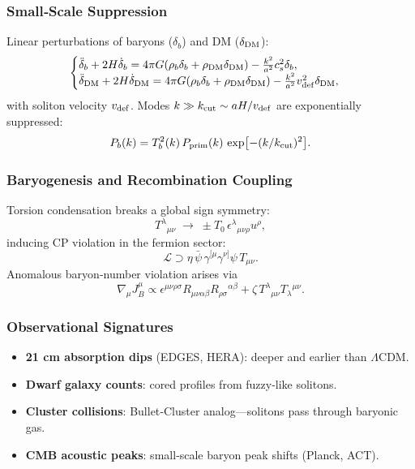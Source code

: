 \documentclass{article}
\begin{document}
\subsubsection{ Small‐Scale Suppression}
Linear perturbations of baryons (\(\delta_b\)) and DM (\(\delta_{\rm DM}\)):
\[
\begin{cases}
  \ddot\delta_b+2H\dot\delta_b
    =4\pi G(\rho_b\delta_b+\rho_{\rm DM}\delta_{\rm DM})
     -\tfrac{k^2}{a^2}c_s^2\delta_b,\\
  \ddot\delta_{\rm DM}+2H\dot\delta_{\rm DM}
    =4\pi G(\rho_b\delta_b+\rho_{\rm DM}\delta_{\rm DM})
     -\tfrac{k^2}{a^2}v_{\rm def}^2\delta_{\rm DM},
\end{cases}
\]
with soliton velocity \(v_{\rm def}\).  Modes \(k\gg k_{\rm cut}\sim aH/v_{\rm def}\)
are exponentially suppressed:
\[
  P_b(k)=T_b^2(k)\,P_{\rm prim}(k)\,\exp\bigl[-(k/k_{\rm cut})^2\bigr].
\]

\subsubsection{ Baryogenesis and Recombination Coupling}
Torsion condensation breaks a global sign symmetry:
\[
  T^{\lambda}{}_{\mu\nu}
  \;\to\;
  \pm T_0\,\epsilon^{\lambda}{}_{\mu\nu\rho}u^\rho,
\]
inducing CP violation in the fermion sector:
\[
  \mathcal L \supset \eta\,\bar\psi\,\gamma^{[\mu}\gamma^{\nu]}\psi\,T_{\mu\nu}.
\]
Anomalous baryon‐number violation arises via
\[
  \nabla_\mu J_B^\mu
  \propto \epsilon^{\mu\nu\rho\sigma}
    R_{\mu\nu\alpha\beta}R_{\rho\sigma}{}^{\alpha\beta}
  +\zeta\,T^{\lambda}{}_{\mu\nu}T_{\lambda}{}^{\mu\nu}.
\]

\subsubsection{ Observational Signatures}
\begin{itemize}
  \item \textbf{21 cm absorption dips} (EDGES, HERA): deeper and earlier than $\Lambda$CDM.  
  \item \textbf{Dwarf galaxy counts}: cored profiles from fuzzy‐like solitons.  
  \item \textbf{Cluster collisions}: Bullet‐Cluster analog—solitons pass through baryonic gas.  
  \item \textbf{CMB acoustic peaks}: small‐scale baryon peak shifts (Planck, ACT).  
\end{itemize}

\medskip
\begin{center}
\end{center}
\medskip
\end{document}
